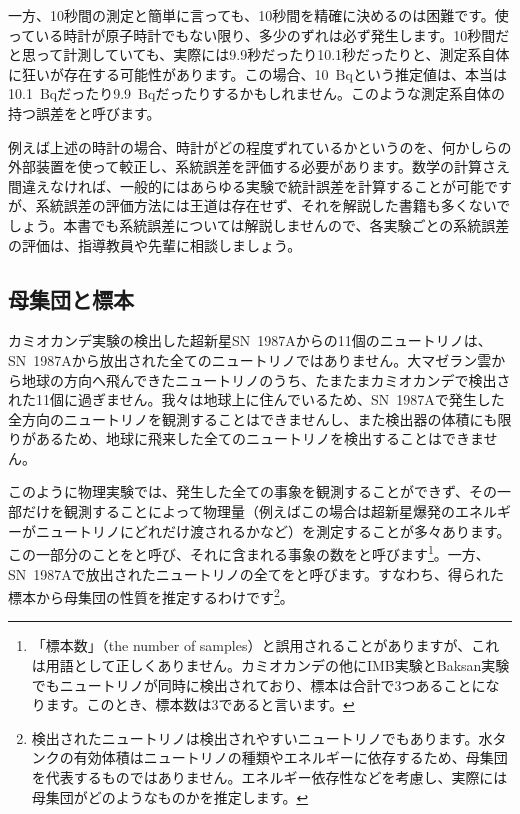 一方、10秒間の測定と簡単に言っても、10秒間を精確に決めるのは困難です。使っている時計が原子時計でもない限り、多少のずれは必ず発生します。10秒間だと思って計測していても、実際には9.9秒だったり10.1秒だったりと、測定系自体に狂いが存在する可能性があります。この場合、10~Bqという推定値は、本当は10.1~Bqだったり9.9~Bqだったりするかもしれません。このような測定系自体の持つ誤差をと呼びます。

例えば上述の時計の場合、時計がどの程度ずれているかというのを、何かしらの外部装置を使って較正し、系統誤差を評価する必要があります。数学の計算さえ間違えなければ、一般的にはあらゆる実験で統計誤差を計算することが可能ですが、系統誤差の評価方法には王道は存在せず、それを解説した書籍も多くないでしょう。本書でも系統誤差については解説しませんので、各実験ごとの系統誤差の評価は、指導教員や先輩に相談しましょう。

\subsection{母集団と標本}

カミオカンデ実験の検出した超新星SN~1987Aからの11個のニュートリノは、SN~1987Aから放出された全てのニュートリノではありません。大マゼラン雲から地球の方向へ飛んできたニュートリノのうち、たまたまカミオカンデで検出された11個に過ぎません。我々は地球上に住んでいるため、SN~1987Aで発生した全方向のニュートリノを観測することはできませんし、また検出器の体積にも限りがあるため、地球に飛来した全てのニュートリノを検出することはできません。

このように物理実験では、発生した全ての事象を観測することができず、その一部だけを観測することによって物理量（例えばこの場合は超新星爆発のエネルギーがニュートリノにどれだけ渡されるかなど）を測定することが多々あります。この一部分のことをと呼び、それに含まれる事象の数をと呼びます\footnote{「標本数」（the number of samples）と誤用されることがありますが、これは用語として正しくありません。カミオカンデの他にIMB実験とBaksan実験でもニュートリノが同時に検出されており、標本は合計で3つあることになります。このとき、標本数は3であると言います。}。一方、SN~1987Aで放出されたニュートリノの全てをと呼びます。すなわち、得られた標本から母集団の性質を推定するわけです\footnote{検出されたニュートリノは検出されやすいニュートリノでもあります。水タンクの有効体積はニュートリノの種類やエネルギーに依存するため、母集団を代表するものではありません。エネルギー依存性などを考慮し、実際には母集団がどのようなものかを推定します。}。

